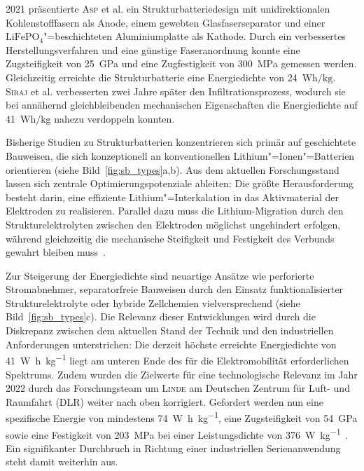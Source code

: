 2021 präsentierte \textsc{Asp} et al. \cite{Asp2021} ein Strukturbatteriedesign mit unidirektionalen Kohlenstofffasern als Anode, einem gewebten Glasfaserseparator und einer $\text{LiFePO}_\text{4}$"=beschichteten Aluminiumplatte als Kathode. Durch ein verbessertes Herstellungsverfahren und eine günstige Faseranordnung konnte eine Zugsteifigkeit von 25~GPa und eine Zugfestigkeit von 300~MPa gemessen werden. Gleichzeitig erreichte die Strukturbatterie eine Energiedichte von 24~$\si{\watt \hour \per \kg}$. \textsc{Siraj} et al. \cite{Siraj2023} verbesserten zwei Jahre später den Infiltrationsprozess, wodurch sie bei annähernd gleichbleibenden mechanischen Eigenschaften die Energiedichte auf 41~$\si{\watt \hour \per \kg}$ nahezu verdoppeln konnten.



Bisherige Studien zu Strukturbatterien konzentrieren sich primär auf geschichtete Bauweisen, die sich konzeptionell an konventionellen Lithium"=Ionen"=Batterien orientieren (siehe Bild~\ref{fig:sb_types}a,b). Aus dem aktuellen Forschungsstand lassen sich zentrale Optimierungspotenziale ableiten: Die größte Herausforderung besteht darin, eine effiziente Lithium"=Interkalation in das Aktivmaterial der Elektroden zu realisieren. Parallel dazu muss die Lithium-Migration durch den Strukturelektrolyten zwischen den Elektroden möglichst ungehindert erfolgen, während gleichzeitig die mechanische Steifigkeit und Festigkeit des Verbunds gewahrt bleiben muss~\cite{Asp2015}.

Zur Steigerung der Energiedichte sind neuartige Ansätze wie perforierte Stromabnehmer, separatorfreie Bauweisen durch den Einsatz funktionalisierter Strukturelektrolyte oder hybride Zellchemien vielversprechend (siehe Bild~\ref{fig:sb_types}c). Die Relevanz dieser Entwicklungen wird durch die Diskrepanz zwischen dem aktuellen Stand der Technik und den industriellen Anforderungen unterstrichen: Die derzeit höchste erreichte Energiedichte von \SI{41}{\watt\hour\per\kg} liegt am unteren Ende des für die Elektromobilität erforderlichen Spektrums. Zudem wurden die Zielwerte für eine technologische Relevanz im Jahr 2022 durch das Forschungsteam um \textsc{Linde} am Deutschen Zentrum für Luft- und Raumfahrt (DLR) weiter nach oben korrigiert. Gefordert werden nun eine spezifische Energie von mindestens \SI{74}{\watt\hour\per\kg}, eine Zugsteifigkeit von \SI{54}{\giga\pascal} sowie eine Festigkeit von \SI{203}{\mega\pascal} bei einer Leistungsdichte von \SI{376}{\watt\per\kg}~\cite{Ishfaq2022}. Ein signifikanter Durchbruch in Richtung einer industriellen Serienanwendung steht damit weiterhin aus.

